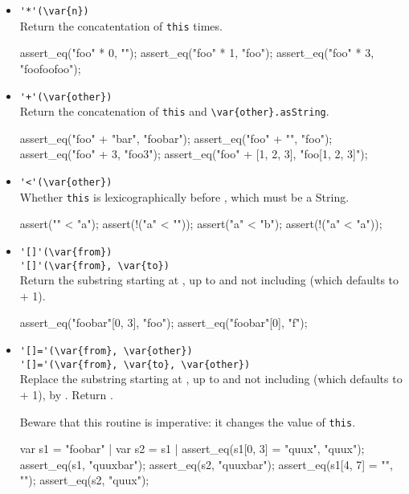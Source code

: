 \begin{itemize}
\item \lstinline|'*'(\var{n})|\\
  Return the concatentation of \lstinline|this|  times.
\begin{urbiscript}[firstnumber=last]
assert_eq("foo" * 0, "");
assert_eq("foo" * 1, "foo");
assert_eq("foo" * 3, "foofoofoo");
\end{urbiscript}

\item \lstinline|'+'(\var{other})|\\
  Return the concatenation of \lstinline|this| and
  \lstinline|\var{other}.asString|.
\begin{urbiscript}[firstnumber=last]
assert_eq("foo" + "bar", "foobar");
assert_eq("foo" + "", "foo");
assert_eq("foo" + 3, "foo3");
assert_eq("foo" + [1, 2, 3], "foo[1, 2, 3]");
\end{urbiscript}

\item \lstinline|'<'(\var{other})|\\
  Whether \lstinline|this| is lexicographically before ,
  which must be a String.
\begin{urbiscript}[firstnumber=last]
assert("" < "a");
assert(!("a" < ""));
assert("a" < "b");
assert(!("a" < "a"));
\end{urbiscript}

\item \lstinline|'[]'(\var{from})|\\
  \lstinline|'[]'(\var{from}, \var{to})|\\
  Return the substring starting at , up to and not including
   (which defaults to  + 1).
\begin{urbiscript}[firstnumber=last]
assert_eq("foobar"[0, 3], "foo");
assert_eq("foobar"[0], "f");
\end{urbiscript}

\item \lstinline|'[]='(\var{from}, \var{other})|\\
  \lstinline|'[]='(\var{from}, \var{to}, \var{other})|\\
  Replace the substring starting at , up to and not including
   (which defaults to  + 1), by .  Return
  .

  Beware that this routine is imperative: it changes the value of
  \lstinline|this|.
\begin{urbiscript}[firstnumber=last]
var s1 = "foobar" | var s2 = s1 |
assert_eq(s1[0, 3] = "quux", "quux");
assert_eq(s1, "quuxbar");
assert_eq(s2, "quuxbar");
assert_eq(s1[4, 7] = "", "");
assert_eq(s2, "quux");
\end{urbiscript}
\end{itemize}


